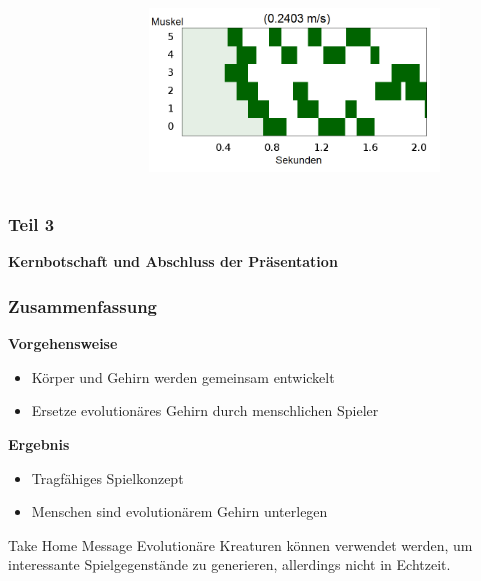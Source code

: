 \documentclass{beamer}
\begin{document}
\begin{frame}
\begin{columns}
\begin{figure}
		\end{figure}
		\begin{figure}
			\includegraphics[width=0.9\textwidth]{img/hum36.png}
		\end{figure}
	\end{columns}
\end{frame}


\begin{frame}
\frametitle{Teil 3}
\textbf{Kernbotschaft und Abschluss der Präsentation}\\
\end{frame}

\begin{frame}
	\frametitle{Zusammenfassung}
	\pause
	\textbf{Vorgehensweise}
	\begin{itemize}
		\item Körper und Gehirn werden gemeinsam entwickelt \pause
		\item Ersetze evolutionäres Gehirn durch menschlichen Spieler \pause
	\end{itemize}
	\vspace{1em}
	\textbf{Ergebnis}
	\begin{itemize}
		\item Tragfähiges Spielkonzept \pause
		\item Menschen sind evolutionärem Gehirn unterlegen \pause
	\end{itemize}
	\vspace{1em}
	\begin{block}{Take Home Message}
		Evolutionäre Kreaturen können verwendet werden, um interessante Spielgegenstände zu generieren, allerdings nicht in Echtzeit.	
	\end{block}
	
\end{frame}
\end{document}
